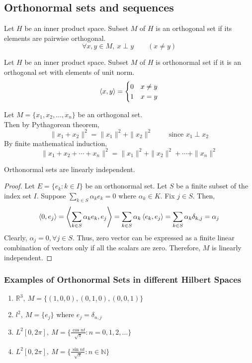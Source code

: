 \subsection{Orthonormal sets and sequences}
\begin{definition}[orthogonal]
	Let $H$ be an inner product space.
	Subset $M$ of $H$ is an orthogonal set if its elements are pairwise orthogonal.
	\[ \forall x,y \in M,\ x \perp y \qquad (x \ne y) \]
\end{definition}
\begin{definition}[orthonormal]
	Let $H$ be an inner product space.
	Subset $M$ of $H$ is orthonormal set if it is an orthogonal set with elements of unit norm.
	\[ \left\langle x,y \right\rangle = \begin{cases} 0 & x \ne y \\ 1 & x = y \end{cases} \]
\end{definition}

\begin{remark}
	Let $M = \{ x_1,x_2,\dots,x_n\}$ be an orthogonal set.\\
	Then by Pythagorean theorem,
	\[ \|x_1 + x_2\|^2 = \|x_1\|^2 + \|x_2\|^2 \qquad \text{ since } x_1 \perp x_2 \]
	By finite mathematical induction,
	\[ \|x_1 + x_2 + \dotsb + x_n\|^2 = \|x_1\|^2 + \|x_2\|^2 + \dotsb + \|x_n\|^2 \]
\end{remark}

\begin{lemma}
	Orthonormal sets are linearly independent.
\end{lemma}
\begin{proof}
	Let $E = \{e_k : k \in I\}$ be an orthonormal set.
	Let $S$ be a finite subset of the index set $I$.
	Suppose $\displaystyle \sum_{k \in S} \alpha_k e_k = 0$ where $\alpha_k \in K$.
	Fix $j \in S$.
	Then,
		\[ \left\langle 0,e_j \right\rangle = \left\langle \sum_{k \in S} \alpha_k e_k,e_j \right\rangle 
		 = \sum_{k \in S} \alpha_k \left\langle e_k,e_j \right\rangle = \sum_{k \in S} \alpha_k \delta_{k,j} = \alpha_j \]
	Clearly, $\alpha_j = 0, \forall j \in S$.
	Thus, zero vector can be expressed as a finite linear combination of vectors only if all the scalars are zero.
	Therefore, $M$ is linearly independent.
\end{proof}

\subsubsection{Examples of Orthonormal Sets in different Hilbert Spaces}
\begin{enumerate}
	\item $\mathbb{R}^3,\ M = \{(1,0,0),(0,1,0),(0,0,1)\}$
	\item $l^2,\ M = \{e_j\}$ where $e_j =\delta_{n,j}$
	\item {\color{red}$L^2[0,2\pi],\ M = \{ \frac{\cos nt}{\sqrt{\pi}} : n =0,1,2,\dotsc \}$}
	\item {\color{red}$L^2[0,2\pi],\ M = \{ \frac{\sin nt}{\sqrt{\pi}} : n \in \mathbb{N} \}$}
\end{enumerate}

